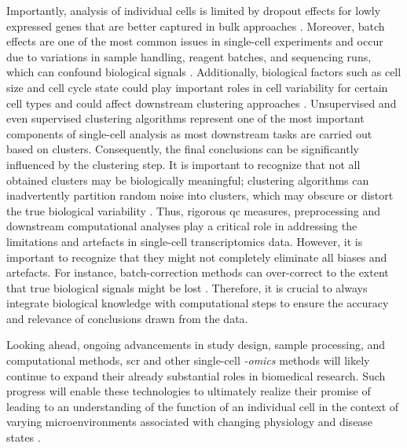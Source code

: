 \par Importantly, analysis of individual cells is limited by dropout effects for lowly expressed genes that are better captured in bulk approaches \textbf{\cite{kharchenko_triumphs_2021}}. Moreover, batch effects are one of the most common issues in single-cell experiments and occur due to variations in sample handling, reagent batches, and sequencing runs, which can confound biological signals \textbf{\cite{heumos_best_2023}}. Additionally, biological factors such as cell size and cell cycle state could play important roles in cell variability for certain cell types and could affect downstream clustering approaches \textbf{\cite{chen_single-cell_2019}}. Unsupervised and even supervised clustering algorithms represent one of the most important components of single-cell analysis as most downstream tasks are carried out based on clusters. Consequently, the final conclusions can be significantly influenced by the clustering step. It is important to recognize that not all obtained clusters may be biologically meaningful; clustering algorithms can inadvertently partition random noise into clusters, which may obscure or distort the true biological variability \textbf{\cite{kiselev_challenges_2019}}. Thus, rigorous \gls{qc} measures, preprocessing and downstream computational analyses play a critical role in addressing the limitations and artefacts in single-cell transcriptomics data. However, it is important to recognize that they might not completely eliminate all biases and artefacts. For instance, batch-correction methods can over-correct to the extent that true biological signals might be lost \textbf{\cite{luecken_benchmarking_2021}}. Therefore, it is crucial to always integrate biological knowledge with computational steps to ensure the accuracy and relevance of conclusions drawn from the data.\\

\par Looking ahead, ongoing advancements in study design, sample processing, and computational methods, \gls{scr} and other single-cell \textit{-omics} methods will likely continue to expand their already substantial roles in biomedical research. Such progress will enable these technologies to ultimately realize their promise of leading to an understanding of the function of an individual cell in the context of varying microenvironments associated with changing physiology and disease states \textbf{\cite{eberwine_promise_2014}}.



